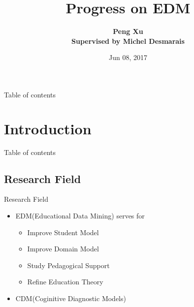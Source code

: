 \documentclass[handout]{beamer}
\begin{document}

\author[Peng Xu]{\textbf {Peng Xu\\ \footnotesize Supervised by Michel Desmarais}}
\title[Title]{Progress on EDM}
\date{Jun 08, 2017}
\frame{\titlepage}



\begin{frame}{Table of contents}
\begin{multicols}{2}
  \tableofcontents
\end{multicols}
\end{frame}


\section{Introduction}
\begin{frame}{Table of contents}
\begin{multicols}{2}
\end{multicols}
\end{frame}


\subsection{Research Field}
\begin{frame}{Research Field}
\begin{itemize}
	\item
		EDM(Educational Data Mining) serves for
		\begin{itemize}
			\item
				Improve Student Model
			\item
				Improve Domain Model
			\item
				Study Pedagogical Support
			\item
				Refine Education Theory
		\end{itemize}
	\item
		CDM(Coginitive Diagnostic Models)
\end{itemize}
\end{frame}
\end{document}
